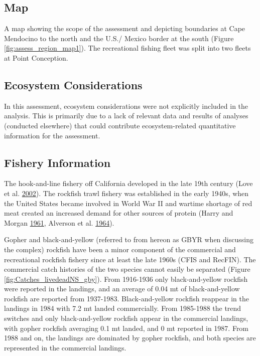\documentclass[12pt,]{article}
\begin{document}
\subsection{Map}\label{map}

A map showing the scope of the assessment and depicting boundaries at
Cape Mendocino to the north and the U.S./ Mexico border at the south
(Figure \ref{fig:assess_region_map1}). The recreational fishing fleet
was split into two fleets at Point Conception.

\subsection{Ecosystem Considerations}\label{ecosystem-considerations-1}

In this assessment, ecosystem considerations were not explicitly
included in the analysis. This is primarily due to a lack of relevant
data and results of analyses (conducted elsewhere) that could contribute
ecosystem-related quantitative information for the assessment.

\subsection{Fishery Information}\label{fishery-information}

The hook-and-line fishery off California developed in the late 19th
century (Love et al. \protect\hyperlink{ref-Love2002}{2002}). The
rockfish trawl fishery was established in the early 1940s, when the
United States became involved in World War II and wartime shortage of
red meat created an increased demand for other sources of protein (Harry
and Morgan \protect\hyperlink{ref-Harry1961}{1961}, Alverson et al.
\protect\hyperlink{ref-Alverson1964}{1964}).

Gopher and black-and-yellow (referred to from hereon as GBYR when
discussing the complex) rockfish have been a minor component of the
commercial and recreational rockfish fishery since at least the late
1960s (CFIS and RecFIN). The commercial catch histories of the two
species cannot easily be separated (Figure
\ref{fig:Catches_livedeadNS_gby}). From 1916-1936 only black-and-yellow
rockfish were reported in the landings, and an average of 0.04 mt of
black-and-yellow rockfish are reported from 1937-1983. Black-and-yellow
rockfish reappear in the landings in 1984 with 7.2 mt landed
commercially. From 1985-1988 the trend switches and only
black-and-yellow rockfish appear in the commercial landings, with gopher
rockfish averaging 0.1 mt landed, and 0 mt reported in 1987. From 1988
and on, the landings are dominated by gopher rockfish, and both species
are represented in the commercial landings.
\end{document}
